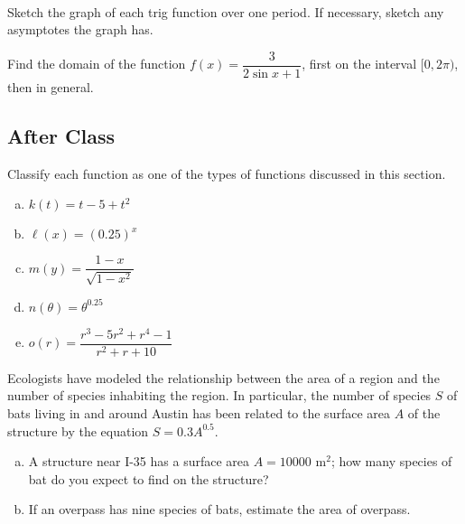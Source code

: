 \documentclass[notes]{subfiles}
\begin{document}
		\begin{rmk}
			\\[75pt]
		\end{rmk}
		\begin{ex}
			Sketch the graph of each trig function over one period.  If necessary, sketch any asymptotes the graph has.
		\end{ex}
			
		\begin{ex}
			Find the domain of the function $f(x) = \dfrac{3}{2\sin x + 1}$, first on the interval $[0,2\pi)$, then in general.
		\end{ex}
			\newpage
			
	
		\subsection*{After Class}	
		\begin{ex}
			Classify each function as one of the types of functions discussed in this section.
			\begin{enumerate}[(a)]
				\item $k(t) = t-5+t^2$
					
				\item $\ell(x) = (0.25)^x$
					
				\item $m(y) = \dfrac{1-x}{\sqrt{1-x^2}}$
					
				\item $n(\theta) = \theta^{0.25}$
					
				\item $o(r) = \dfrac{r^3-5r^2 + r^4-1}{r^2 + r+10}$
					
			\end{enumerate}
		\end{ex}
		\newpage
		
		\begin{ex}
			Ecologists have modeled the relationship between the area of a region and the number of species inhabiting the region.  In particular, the number of species $S$ of bats living in and around Austin has been related to the surface area $A$ of the structure by the equation $S = 0.3A^{0.5}$.
			\begin{enumerate}[(a)]
				\item A structure near I-35 has a surface area $A = 10000$ m$^2$; how many species of bat do you expect to find on the structure?
					\vs{1}
					
				\item If an overpass has nine species of bats, estimate the area of overpass.
					\vs{1}
			\end{enumerate}
		\end{ex}
		
\end{document}
